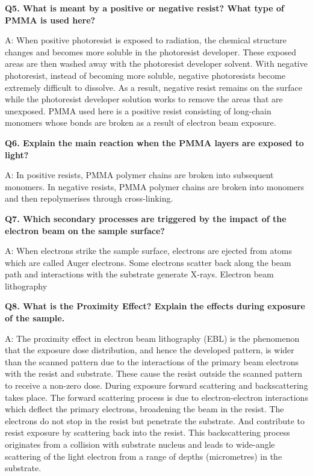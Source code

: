 \documentclass[12pt]{article}
\begin{document}
\textbf{Q5. What is meant by a positive or negative resist? What type of PMMA is used here?}

A: When positive photoresist is exposed to radiation, the chemical structure changes and becomes
more soluble in the photoresist developer. These exposed areas are then washed away with the
photoresist developer solvent.
With negative photoresist, instead of becoming more soluble, negative photoresists become
extremely difficult to dissolve. As a result, negative resist remains on the surface while the
photoresist developer solution works to remove the areas that are unexposed.
PMMA used here is a positive resist consisting of long-chain monomers whose bonds are
broken as a result of electron beam exposure.

\textbf{Q6. Explain the main reaction when the PMMA layers are exposed to light?}

A: In positive resists, PMMA polymer chains are broken into subsequent monomers.
In negative resists, PMMA polymer chains are broken into monomers and then repolymerises
through cross-linking.

\textbf{Q7. Which secondary processes are triggered by the impact of the electron beam on the
sample surface?}

A: When electrons strike the sample surface, electrons are ejected from atoms which are called
Auger electrons. Some electrons scatter back along the beam path and interactions with the
substrate generate X-rays.
Electron beam lithography

\textbf{Q8. What is the Proximity Effect? Explain the effects during exposure of the sample.}

A: The proximity effect in electron beam lithography (EBL) is the phenomenon that the exposure
dose distribution, and hence the developed pattern, is wider than the scanned pattern due to the
interactions of the primary beam electrons with the resist and substrate. These cause the resist
outside the scanned pattern to receive a non-zero dose.
During exposure forward scattering and backscattering takes
place. The forward scattering process is due to electron-electron
interactions which deflect the primary electrons, broadening the
beam in the resist. The electrons do not stop in the resist but
penetrate the substrate. And contribute to resist exposure by
scattering back into the resist. This backscattering process
originates from a collision with substrate nucleus and leads to
wide-angle scattering of the light electron from a range of depths
(micrometres) in the substrate.
\end{document}
